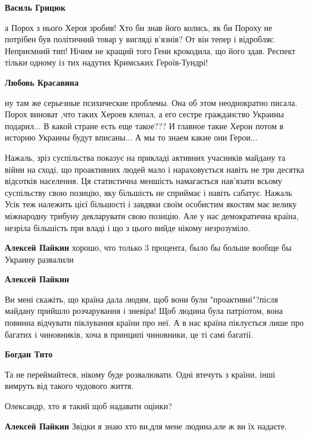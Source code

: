 \begin{itemize}
\begin{itemize}
\textbf{Василь Грицюк} 

а Порох з нього Хероя зробив! Хто би знав його колись, як би Пороху не потрібен
був політичний товар у вигляді в'язнів? От він тепер і відробляє. Неприємний
тип! Нічим не кращий того Гени крокодила, що його здав. Респект тільки одному із
тих надутих Кримських Героїв-Тундрі!

\textbf{Любовь Красавина} 

ну там же серьезные психические проблемы. Она об этом неоднократно писала. Порох
виноват ,что таких Хероев клепал, а его сестре гражданство Украины подарил... В
какой стране есть еще такое??? И главное такие Херои потом в историю Украины
будут вписаны... А мы то знаем какие они Герои...

\end{itemize} %


Нажаль, зріз суспільства показує на прикладі активних учасників майдану та
війни на сході, що проактивних людей мало і нараховується навіть не три десятка
відсотків населення. Ця статистична меншість намагається нав'язати всьому
суспільству свою позицію, яку більшість не сприймає і навіть сабатує. Нажаль
Усік теж належить цієї більшості і завдяки своїм особистим якостям має велику
міжнародну трибуну декларувати свою позицію. Але у нас демократична країна,
незріла більшість при владі і що з цього вийде нікому незрозуміло.

\begin{itemize} %
\textbf{Алексей Пайкин} хорошо, что только 3 процента, было бы больше вообще бы Украину развалили

\textbf{Алексей Пайкин} 

Ви мені скажіть, що країна дала людям, щоб вони були "проактивні"?після майдану
прийшло розчарування і зневіра! Щоб людина була патріотом, вона повинна відчувати
піклування країни про неї. А в нас країна піклується лише про багатих і
чиновників, хоча в принципі чиновники, це ті самі багатії.


\textbf{Богдан Тито} 

Та не переймайтеся, нікому буде розвалювати. Одні втечуть з країни, інші
вимруть від такого чудового життя.

Олександр, хто я такий щоб надавати оцінки?

\textbf{Алексей Пайкин} Звідки я знаю хто ви,для мене людина,але ж ви їх надаєте.


\end{itemize}
\end{itemize}
